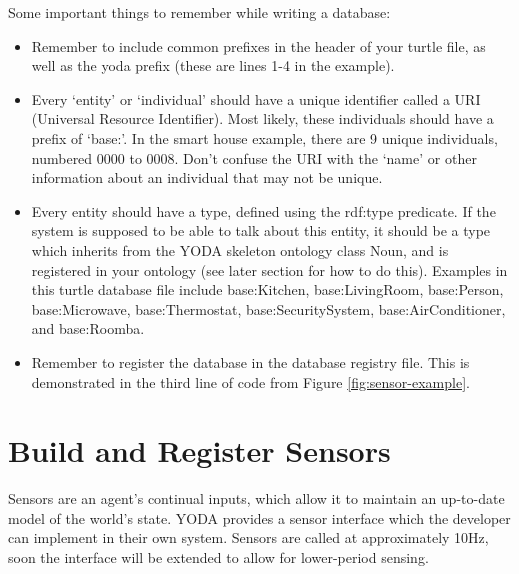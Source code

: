 \documentclass[titlepage]{article}
\begin{document}
Some important things to remember while writing a database:
\begin{itemize}
\item Remember to include common prefixes in the header of your turtle file, as well as the yoda prefix (these are lines 1-4 in the example).
\item Every `entity' or `individual' should have a unique identifier called a URI (Universal Resource Identifier). Most likely, these individuals should have a prefix of `base:'. In the smart house example, there are 9 unique individuals, numbered 0000 to 0008. Don't confuse the URI with the `name' or other information about an individual that may not be unique.
\item Every entity should have a type, defined using the rdf:type predicate. If the system is supposed to be able to talk about this entity, it should be a type which inherits from the YODA skeleton ontology class Noun, and is registered in your ontology (see later section for how to do this). Examples in this turtle database file include base:Kitchen, base:LivingRoom, base:Person, base:Microwave, base:Thermostat, base:SecuritySystem, base:AirConditioner, and base:Roomba.
\item Remember to register the database in the database registry file. This is demonstrated in the third line of code from Figure \ref{fig:sensor-example}.
\end{itemize}



\section{Build and Register Sensors}

Sensors are an agent's continual inputs, which allow it to maintain an up-to-date model of the world's state.
YODA provides a sensor interface which the developer can implement in their own system.
Sensors are called at approximately 10Hz, soon the interface will be extended to allow for lower-period sensing.
\end{document}
